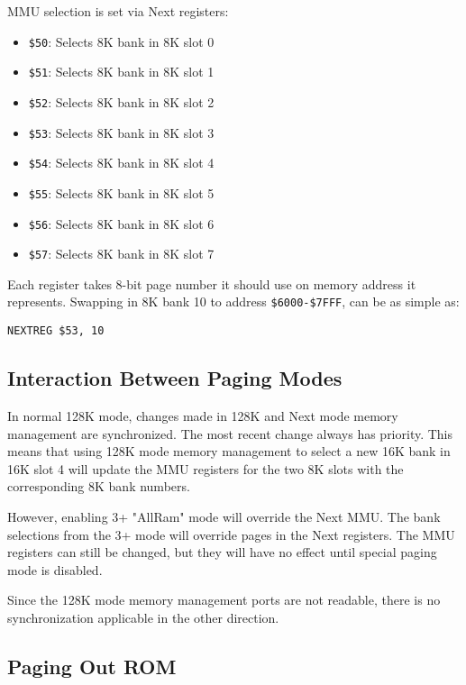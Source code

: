\documentclass[12pt,twoside,openright,a4paper]{book}
\begin{document}
MMU selection is set via Next registers:

\begin{itemize}
	\item {\tt \$50}: Selects 8K bank in 8K slot 0
	\item {\tt \$51}: Selects 8K bank in 8K slot 1
	\item {\tt \$52}: Selects 8K bank in 8K slot 2
	\item {\tt \$53}: Selects 8K bank in 8K slot 3
	\item {\tt \$54}: Selects 8K bank in 8K slot 4
	\item {\tt \$55}: Selects 8K bank in 8K slot 5
	\item {\tt \$56}: Selects 8K bank in 8K slot 6
	\item {\tt \$57}: Selects 8K bank in 8K slot 7
\end{itemize}

Each register takes 8-bit page number it should use on memory address it represents. Swapping in 8K bank 10 to address {\tt \$6000-\$7FFF}, can be as simple as:

\begin{Verbatim}[gobble=1]
	NEXTREG $53, 10
\end{Verbatim}


\pagebreak
\subsection{Interaction Between Paging Modes}

In normal 128K mode, changes made in 128K and Next mode memory management are synchronized. The most recent change always has priority. This means that using 128K mode memory management to select a new 16K bank in 16K slot 4 will update the MMU registers for the two 8K slots with the corresponding 8K bank numbers.

However, enabling 3+ "AllRam" mode will override the Next MMU. The bank selections from the 3+ mode will override pages in the Next registers. The MMU registers can still be changed, but they will have no effect until special paging mode is disabled.

Since the 128K mode memory management ports are not readable, there is no synchronization applicable in the other direction.


\subsection{Paging Out ROM}
\end{document}
